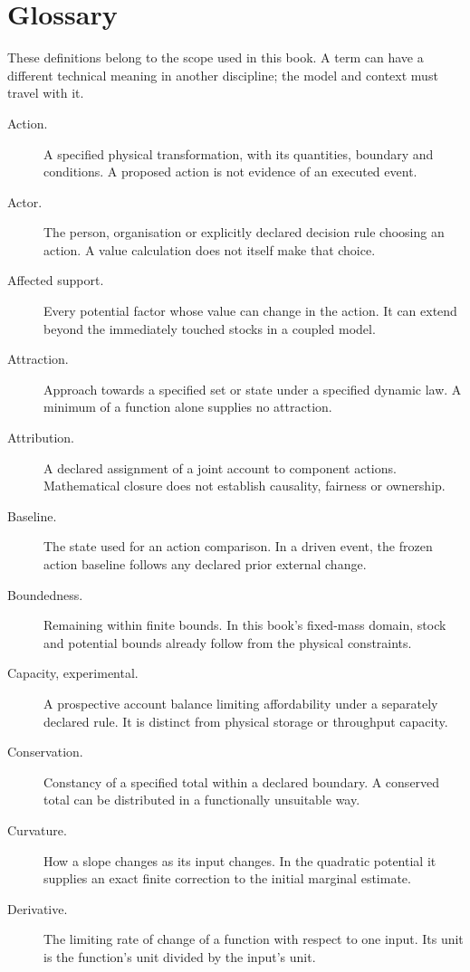 \chapter*{Glossary}
These definitions belong to the scope used in this book. A term can have a different technical meaning in another discipline; the model and context must travel with it.

\begin{description}
\item[Action.] A specified physical transformation, with its quantities, boundary and conditions. A proposed action is not evidence of an executed event.
\item[Actor.] The person, organisation or explicitly declared decision rule choosing an action. A value calculation does not itself make that choice.
\item[Affected support.] Every potential factor whose value can change in the action. It can extend beyond the immediately touched stocks in a coupled model.
\item[Attraction.] Approach towards a specified set or state under a specified dynamic law. A minimum of a function alone supplies no attraction.
\item[Attribution.] A declared assignment of a joint account to component actions. Mathematical closure does not establish causality, fairness or ownership.
\item[Baseline.] The state used for an action comparison. In a driven event, the frozen action baseline follows any declared prior external change.
\item[Boundedness.] Remaining within finite bounds. In this book's fixed-mass domain, stock and potential bounds already follow from the physical constraints.
\item[Capacity, experimental.] A prospective account balance limiting affordability under a separately declared rule. It is distinct from physical storage or throughput capacity.
\item[Conservation.] Constancy of a specified total within a declared boundary. A conserved total can be distributed in a functionally unsuitable way.
\item[Curvature.] How a slope changes as its input changes. In the quadratic potential it supplies an exact finite correction to the initial marginal estimate.
\item[Derivative.] The limiting rate of change of a function with respect to one input. Its unit is the function's unit divided by the input's unit.

\end{description}
